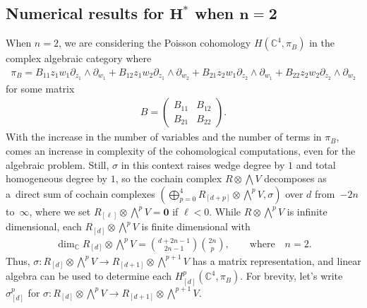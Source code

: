 \documentclass[pdftex]{sigma}
\numberwithin{equation}{section}
\begin{document}
\subsection[Numerical results for $H^{*}$ when $n=2$]{Numerical results for $\boldsymbol{H^{*}}$ when $\boldsymbol{n=2}$}

When $n=2$, we are considering the Poisson cohomology $H({\mathbb C}^4,\pi_B)$ in the complex algebraic category where
\begin{gather*}
\pi_B=B_{11}z_1w_1\partial_{z_1}\wedge\partial_{w_1}+B_{12}z_1w_2\partial_{z_1}\wedge\partial_{w_2} +B_{21}z_2w_1\partial_{z_2}\wedge\partial_{w_1}+B_{22}z_2w_2\partial_{z_2}\wedge\partial_{w_2}
\end{gather*}
for some matrix
\begin{gather*}
B=\begin{pmatrix}B_{11} & B_{12} \\ B_{21} & B_{22}\end{pmatrix}.
\end{gather*}
With the increase in the number of variables and the number of terms in $\pi_B$, comes an increase in complexity of the cohomological computations, even for the algebraic problem. Still, $\sigma$ in this context raises wedge degree by $1$ and total homogeneous degree by $1$, so the cochain complex $R\otimes \bigwedge V$ decomposes as a~direct sum of cochain complexes $(\bigoplus_{p=0}^{4}R_{[d+p]}\otimes \bigwedge^p V,\sigma)$ over $d$ from~$-2n$ to~$\infty$, where we set $R_{[\ell]}\otimes \bigwedge^p V=\mathbf 0$ if $\ell <0$. While $R\otimes \bigwedge^p V$ is inf\/inite dimensional, each $R_{[d]}\otimes \bigwedge^p V$ is f\/inite dimensional with
\begin{gather*}
\dim_{\mathbb C} R_{[d]}\otimes \textstyle{\bigwedge^p V}= {d+2n-1 \choose 2n-1} {2n\choose p}, \qquad \text{where} \quad n=2.
\end{gather*}
Thus, $\sigma\colon R_{[d]}\otimes \bigwedge^p V\to R_{[d+1]}\otimes \bigwedge^{p+1} V$ has a matrix representation, and linear algebra can be used to determine each $H^p_{[d]}({\mathbb C}^4,\pi_B)$. For brevity, let's write $\sigma^p_{[d]}$ for $\sigma\colon R_{[d]}\otimes \bigwedge^p V\to R_{[d+1]}\otimes \bigwedge^{p+1} V$.
\end{document}
